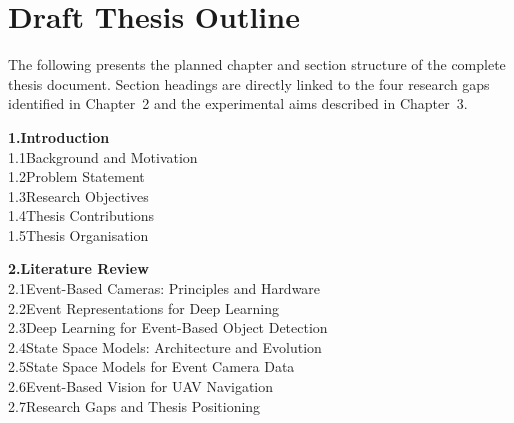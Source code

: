 \documentclass[11pt, a4paper]{report}
\begin{document}
\chapter{Draft Thesis Outline}
\label{app:outline}

\noindent The following presents the planned chapter and section structure of the complete thesis document. Section headings are directly linked to the four research gaps identified in Chapter~2 and the experimental aims described in Chapter~3.

\bigskip

\noindent\textbf{1.\quad Introduction}\\[3pt]
\hspace*{2em}1.1\quad Background and Motivation\\[2pt]
\hspace*{2em}1.2\quad Problem Statement\\[2pt]
\hspace*{2em}1.3\quad Research Objectives\\[2pt]
\hspace*{2em}1.4\quad Thesis Contributions\\[2pt]
\hspace*{2em}1.5\quad Thesis Organisation

\bigskip

\noindent\textbf{2.\quad Literature Review}\\[3pt]
\hspace*{2em}2.1\quad Event-Based Cameras: Principles and Hardware\\[2pt]
\hspace*{2em}2.2\quad Event Representations for Deep Learning\\[2pt]
\hspace*{2em}2.3\quad Deep Learning for Event-Based Object Detection\\[2pt]
\hspace*{2em}2.4\quad State Space Models: Architecture and Evolution\\[2pt]
\hspace*{2em}2.5\quad State Space Models for Event Camera Data\\[2pt]
\hspace*{2em}2.6\quad Event-Based Vision for UAV Navigation\\[2pt]
\hspace*{2em}2.7\quad Research Gaps and Thesis Positioning

\bigskip
\end{document}
